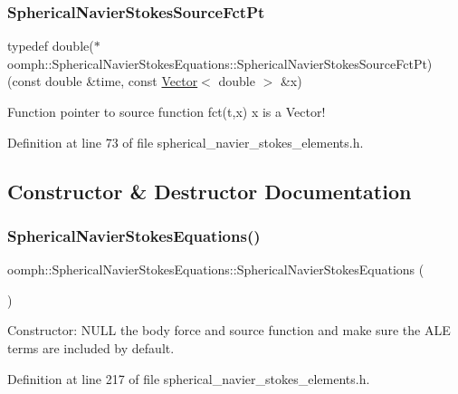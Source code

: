 \subsubsection{\texorpdfstring{Spherical\+Navier\+Stokes\+Source\+Fct\+Pt}{SphericalNavierStokesSourceFctPt}}
{\footnotesize\ttfamily typedef double($\ast$ oomph\+::\+Spherical\+Navier\+Stokes\+Equations\+::\+Spherical\+Navier\+Stokes\+Source\+Fct\+Pt) (const double \&time, const \hyperlink{classoomph_1_1Vector}{Vector}$<$ double $>$ \&x)}



Function pointer to source function fct(t,x) x is a Vector! 



Definition at line 73 of file spherical\+\_\+navier\+\_\+stokes\+\_\+elements.\+h.



\subsection{Constructor \& Destructor Documentation}
\mbox{\label{classoomph_1_1SphericalNavierStokesEquations_adb7856b86fa6d5d35b03596649c86a70}} 
\subsubsection{\texorpdfstring{Spherical\+Navier\+Stokes\+Equations()}{SphericalNavierStokesEquations()}}
{\footnotesize\ttfamily oomph\+::\+Spherical\+Navier\+Stokes\+Equations\+::\+Spherical\+Navier\+Stokes\+Equations (\begin{DoxyParamCaption}{ }\end{DoxyParamCaption})\hspace{0.3cm}{\ttfamily [inline]}}



Constructor\+: N\+U\+LL the body force and source function and make sure the A\+LE terms are included by default. 



Definition at line 217 of file spherical\+\_\+navier\+\_\+stokes\+\_\+elements.\+h.



